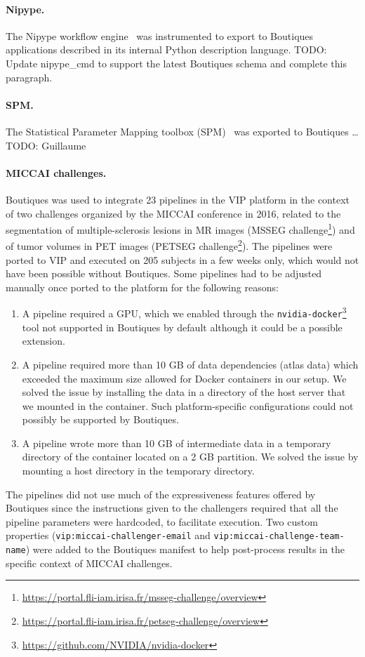 \documentclass{article}
\newcommand{\todo}[1]{\color{red}TODO: #1\color{black}}
\newcommand{\boutiques}{Boutiques\xspace}
\begin{document}
\paragraph{Nipype.} The Nipype workflow engine~\cite{gorgolewski2011nipype} was
instrumented to export to Boutiques applications described in its
internal Python description language. \todo{Update nipype\_cmd to
  support the latest Boutiques schema and complete this paragraph.}

\paragraph{SPM.} The Statistical Parameter Mapping toolbox (SPM)~\cite{penny2011statistical}
was exported to Boutiques \ldots \todo{Guillaume}

\paragraph{MICCAI challenges.}
Boutiques was used to integrate 23 pipelines in the VIP platform in
the context of two challenges organized by the MICCAI conference in
2016, related to the segmentation of multiple-sclerosis lesions in MR
images (MSSEG
challenge\footnote{\url{https://portal.fli-iam.irisa.fr/msseg-challenge/overview}})
and of tumor volumes in PET images (PETSEG
challenge\footnote{\url{https://portal.fli-iam.irisa.fr/petseg-challenge/overview}}). The
pipelines were ported to VIP and executed on 205 subjects in a few
weeks only, which would not have been possible without
\boutiques. Some pipelines had to be adjusted manually once ported to
the platform for the following reasons:
\begin{enumerate}
\item A pipeline
  required a GPU, which we enabled through the
  \texttt{nvidia-docker}\footnote{\url{https://github.com/NVIDIA/nvidia-docker}}
  tool not supported in Boutiques by default although it could be a possible extension.
\item A pipeline required more than 10 GB of data dependencies (atlas
  data) which exceeded the maximum size allowed for Docker containers
  in our setup. We solved the issue by installing the data in a
  directory of the host server that we mounted in the container. Such
  platform-specific configurations could not possibly be supported by
  \boutiques.
\item A pipeline wrote more than 10 GB of intermediate data in a
  temporary directory of the container located on a 2 GB partition. We
  solved the issue by mounting a host directory in the temporary directory.
\end{enumerate}
The pipelines did not use much of the expressiveness features offered
by Boutiques since the instructions given to the challengers required
that all the pipeline parameters were hardcoded, to facilitate
execution. Two custom properties (\texttt{vip:miccai-challenger-email}
and \texttt{vip:miccai-challenge-team-name}) were added to the
\boutiques manifest to help post-process results in the specific
context of MICCAI challenges.
\end{document}
